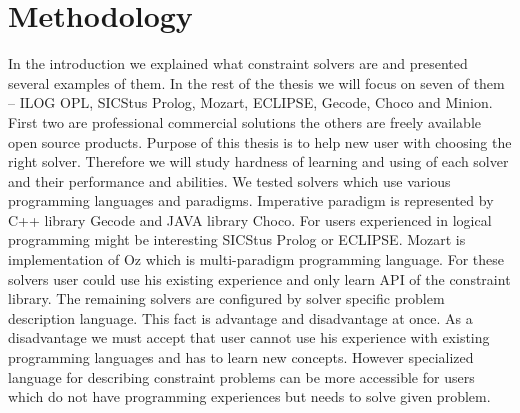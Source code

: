 \chapter{Methodology}
\thispagestyle{myheadings}

In the introduction we explained what constraint solvers are and presented several 
examples of them. In the rest of the thesis we will focus on seven of them -- ILOG 
OPL, SICStus Prolog, Mozart, ECLIPSE, Gecode, Choco and Minion. First two are 
professional commercial solutions the others are freely available open source 
products. Purpose of this thesis is to help new user with choosing the right solver. 
Therefore we will study hardness of learning and using of each solver and their 
performance and abilities. We tested solvers which use various programming languages 
and paradigms. Imperative paradigm is represented by C++ library Gecode and JAVA 
library Choco. For users experienced in logical programming might be interesting 
SICStus Prolog or ECLIPSE. Mozart is implementation of Oz which is multi-paradigm 
programming language. For these solvers user could use his existing experience and 
only learn API of the constraint library. The remaining solvers are configured by 
solver specific problem description language. This fact is advantage and disadvantage 
at once. As a disadvantage we must accept that user cannot use his experience with 
existing programming languages and has to learn new concepts. However specialized 
language for describing constraint problems can be more accessible for users which 
do not have programming experiences but needs to solve given problem.

